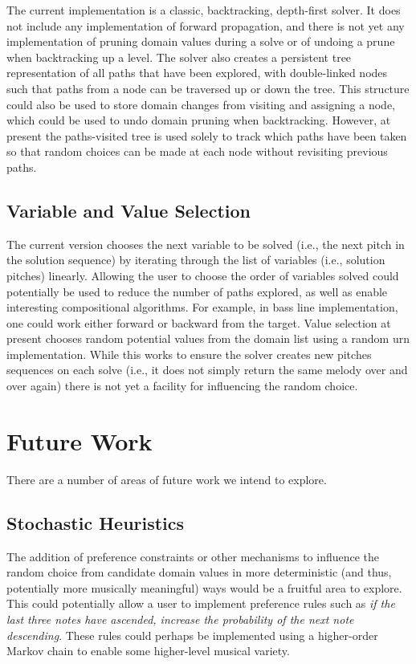 \documentclass[pmlr]{jmlr}%
\begin{document}
The current implementation is a classic, backtracking, depth-first
solver.  It does not include any implementation of forward
propagation, and there is not yet any implementation of pruning domain
values during a solve or of undoing a prune when backtracking up a
level. The solver also creates a persistent tree representation of all
paths that have been explored, with double-linked nodes such that
paths from a node can be traversed up or down the tree.  This
structure could also be used to store domain changes from visiting
and assigning a node, which could be used to undo domain pruning when
backtracking.  However, at present the paths-visited tree is used
solely to track which paths have been taken so that random choices can
be made at each node without revisiting previous paths.

\subsection{Variable and Value Selection}
The current version chooses the next variable to be solved (i.e., the next pitch in the solution
sequence) by iterating through the list of variables (i.e., solution pitches) linearly. 
Allowing the user to choose the order of variables solved
could potentially be used to reduce the number of paths explored, as well
as enable interesting compositional algorithms. For example, in 
bass line implementation, one could work either forward or backward from the target. Value selection at present chooses random potential values
from the domain list using a random urn implementation. While this works
to ensure the solver creates new pitches sequences on each solve 
(i.e., it does not simply return the same melody over and over again)
there is not yet a facility for influencing the random choice.

\section{Future Work}
There are a number of areas of future work we intend to explore.

\subsection{Stochastic Heuristics}
The addition of preference constraints or other mechanisms to influence
the random choice from candidate domain values 
in more deterministic (and thus, potentially more musically meaningful) ways would be a fruitful 
area to explore. This could potentially allow a user to implement preference rules
such as \textit{if the last three notes have ascended, increase the probability of the next note descending}. These rules could perhaps be implemented using
a higher-order Markov chain to enable some higher-level musical variety.
\end{document}
